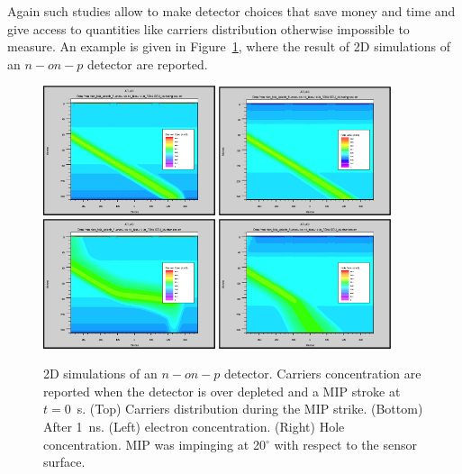 Again such studies allow to make detector choices that save money and time and give access to 
quantities like carriers distribution otherwise impossible to measure. An example is given in 
Figure~\ref{fig:carr_conc}, where the result of 2D simulations of an  $n-on-p$ detector 
are reported.

\begin{figure}[!htbp]
\centering
\includegraphics[width=0.45\textwidth]{econ_early.png}
\includegraphics[width=0.45\textwidth]{hcon_early.png}
\includegraphics[width=0.45\textwidth]{econ_late.png}
\includegraphics[width=0.45\textwidth]{hcon_late.png}
\caption{\label{fig:carr_conc}2D simulations of an $n-on-p$ detector. Carriers concentration
are reported when the detector is over depleted and a MIP stroke at $t=0$~s. 
(Top) Carriers distribution during the MIP strike. (Bottom) After 1~ns. (Left) electron concentration. 
(Right) Hole concentration. MIP was impinging at 20$^{\circ}$ with respect to the sensor surface.}
\end{figure}

